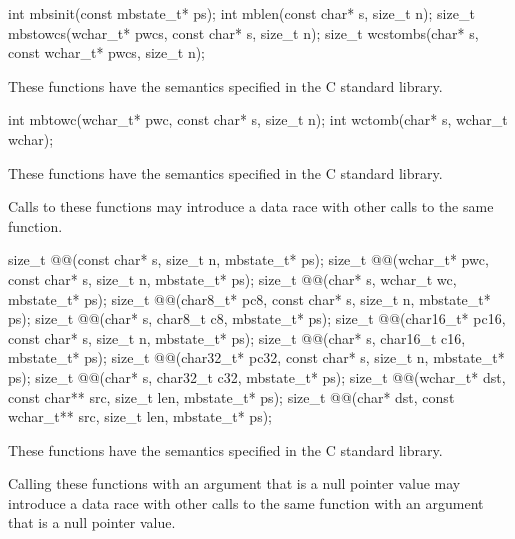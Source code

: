 %
%
%
%
\begin{itemdecl}
int mbsinit(const mbstate_t* ps);
int mblen(const char* s, size_t n);
size_t mbstowcs(wchar_t* pwcs, const char* s, size_t n);
size_t wcstombs(char* s, const wchar_t* pwcs, size_t n);
\end{itemdecl}

\begin{itemdescr}
\pnum
\effects
These functions have the semantics specified in the C standard library.
\end{itemdescr}


%
%
\begin{itemdecl}
int mbtowc(wchar_t* pwc, const char* s, size_t n);
int wctomb(char* s, wchar_t wchar);
\end{itemdecl}

\begin{itemdescr}
\pnum
\effects
These functions have the semantics specified in the C standard library.

\pnum
\remarks
Calls to these functions
may introduce a data race
with other calls to the same function.
\end{itemdescr}


\begin{itemdecl}
size_t @@(const char* s, size_t n, mbstate_t* ps);
size_t @@(wchar_t* pwc, const char* s, size_t n, mbstate_t* ps);
size_t @@(char* s, wchar_t wc, mbstate_t* ps);
size_t @@(char8_t* pc8, const char* s, size_t n, mbstate_t* ps);
size_t @@(char* s, char8_t c8, mbstate_t* ps);
size_t @@(char16_t* pc16, const char* s, size_t n, mbstate_t* ps);
size_t @@(char* s, char16_t c16, mbstate_t* ps);
size_t @@(char32_t* pc32, const char* s, size_t n, mbstate_t* ps);
size_t @@(char* s, char32_t c32, mbstate_t* ps);
size_t @@(wchar_t* dst, const char** src, size_t len, mbstate_t* ps);
size_t @@(char* dst, const wchar_t** src, size_t len, mbstate_t* ps);
\end{itemdecl}

\begin{itemdescr}
\pnum
\effects
These functions have the semantics specified in the C standard library.

\pnum
\remarks
Calling these functions
with an  argument that is a null pointer value
may introduce a data race
with other calls to the same function
with an  argument that is a null pointer value.
\end{itemdescr}

